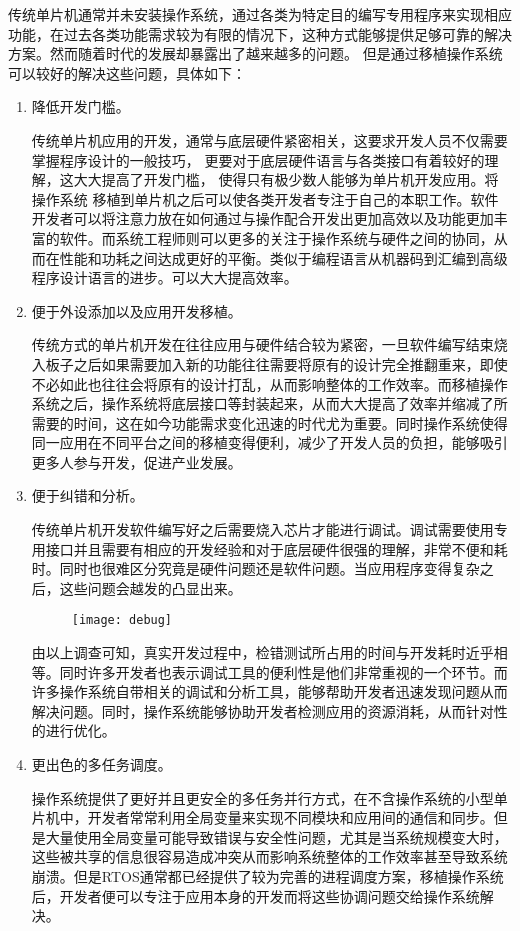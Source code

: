 \documentclass{ctexart}
\begin{document}
传统单片机通常并未安装操作系统，通过各类为特定目的编写专用程序来实现相应功能，在过去各类功能需求较为有限的情况下，这种方式能够提供足够可靠的解决方案。然而随着时代的发展却暴露出了越来越多的问题。 但是通过移植操作系统可以较好的解决这些问题，具体如下：\par
\begin{enumerate}
  \item 降低开发门槛。\par
    传统单片机应用的开发，通常与底层硬件紧密相关，这要求开发人员不仅需要掌握程序设计的一般技巧， 更要对于底层硬件语言与各类接口有着较好的理解，这大大提高了开发门槛， 使得只有极少数人能够为单片机开发应用。将操作系统 移植到单片机之后可以使各类开发者专注于自己的本职工作。软件开发者可以将注意力放在如何通过与操作配合开发出更加高效以及功能更加丰富的软件。而系统工程师则可以更多的关注于操作系统与硬件之间的协同，从而在性能和功耗之间达成更好的平衡。\cite{rtos}类似于编程语言从机器码到汇编到高级程序设计语言的进步。可以大大提高效率。
  \item 便于外设添加以及应用开发移植。\par
    传统方式的单片机开发在往往应用与硬件结合较为紧密，一旦软件编写结束烧入板子之后如果需要加入新的功能往往需要将原有的设计完全推翻重来，即使不必如此也往往会将原有的设计打乱，从而影响整体的工作效率。而移植操作系统之后，操作系统将底层接口等封装起来，从而大大提高了效率并缩减了所需要的时间，这在如今功能需求变化迅速的时代尤为重要。同时操作系统使得同一应用在不同平台之间的移植变得便利，减少了开发人员的负担，能够吸引更多人参与开发，促进产业发展。\cite{rtos_in_mcu}
  \item 便于纠错和分析。\par
    传统单片机开发软件编写好之后需要烧入芯片才能进行调试。调试需要使用专用接口并且需要有相应的开发经验和对于底层硬件很强的理解，非常不便和耗时。同时也很难区分究竟是硬件问题还是软件问题。当应用程序变得复杂之后，这些问题会越发的凸显出来。\par
    \begin{figure}[h]
\centering
    \texttt{[image: debug]}\par
    \end{figure}
    由以上调查可知\cite{survey}，真实开发过程中，检错测试所占用的时间与开发耗时近乎相等。同时许多开发者也表示调试工具的便利性是他们非常重视的一个环节。而许多操作系统自带相关的调试和分析工具，能够帮助开发者迅速发现问题从而解决问题。同时，操作系统能够协助开发者检测应用的资源消耗，从而针对性的进行优化。
  \item 更出色的多任务调度。\par
    操作系统提供了更好并且更安全的多任务并行方式，在不含操作系统的小型单片机中，开发者常常利用全局变量来实现不同模块和应用间的通信和同步。但是大量使用全局变量可能导致错误与安全性问题，尤其是当系统规模变大时，这些被共享的信息很容易造成冲突从而影响系统整体的工作效率甚至导致系统崩溃。但是RTOS通常都已经提供了较为完善的进程调度方案，移植操作系统后，开发者便可以专注于应用本身的开发而将这些协调问题交给操作系统解决。

\end{enumerate}
\end{document}
